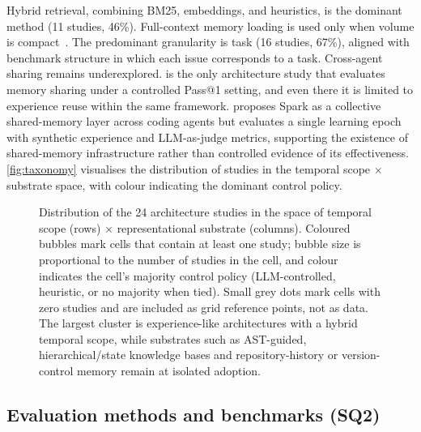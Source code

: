Hybrid retrieval, combining BM25, embeddings, and heuristics, is the
dominant method (11 studies, 46\%).
Full-context memory loading is used only when volume is
compact~\citep{xia2025livesweagent,zhang2025accelopt}.
The predominant granularity is task (16 studies, 67\%), aligned with
benchmark structure in which each issue corresponds to a task.
Cross-agent sharing remains underexplored.
\citet{chen2025sweexp} is the only architecture study that evaluates
memory sharing under a controlled Pass@1 setting, and even there it is
limited to experience reuse within the same framework.
\citet{tablan2025smarter} proposes Spark as a collective shared-memory
layer across coding agents but evaluates a single learning epoch with
synthetic experience and LLM-as-judge metrics, supporting the existence
of shared-memory infrastructure rather than controlled evidence of its
effectiveness.
\autoref{fig:taxonomy} visualises the distribution of studies in the
temporal scope $\times$ substrate space, with colour indicating the
dominant control policy.

\begin{figure}[!htbp]
  \centering
  \resizebox{\textwidth}{!}{}
  \caption{Distribution of the 24 architecture studies in the space of
    temporal scope (rows) $\times$ representational substrate
    (columns).
    Coloured bubbles mark cells that contain at least one study;
    bubble size is proportional to the number of studies in the
    cell, and colour indicates the cell's majority control policy
    (LLM-controlled, heuristic, or no majority when tied).
    Small grey dots mark cells with zero studies and are included
    as grid reference points, not as data.
    The largest cluster is experience-like architectures with a
    hybrid temporal scope, while substrates such as AST-guided,
    hierarchical/state knowledge bases and repository-history or
    version-control memory remain at isolated adoption.}
  \label{fig:taxonomy}
\end{figure}

\FloatBarrier
\subsection{Evaluation methods and benchmarks (SQ2)}
\label{sec:sq2}

